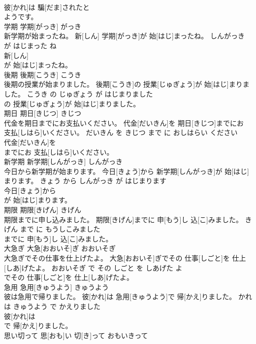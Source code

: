 \documentclass[8pt]{extreport}
\begin{document}
\begin{CJK}{UTF8}{min}
\\	彼[かれ]は 騙[だま]されたと
\\	ようです。			
\\	学期	学期[がっき]	がっき	
\\	新学期が始まったね。	新[しん] 学期[がっき]が 始[はじ]まったね。	しんがっき が はじまった ね	
\\	新[しん]
\\	が 始[はじ]まったね。			
\\	後期	後期[こうき]	こうき	
\\	後期の授業が始まりました。	後期[こうき]の 授業[じゅぎょう]が 始[はじ]まりました。	こうき の じゅぎょう が はじまりました	
\\	の 授業[じゅぎょう]が 始[はじ]まりました。			
\\	期日	期日[きじつ]	きじつ	
\\	代金を期日までにお支払いください。	代金[だいきん]を 期日[きじつ]までにお 支払[しはら]いください。	だいきん を きじつ まで に おしはらい ください	
\\	代金[だいきん]を
\\	までにお 支払[しはら]いください。			
\\	新学期	新学期[しんがっき]	しんがっき	
\\	今日から新学期が始まります。	今日[きょう]から 新学期[しんがっき]が 始[はじ]まります。	きょう から しんがっき が はじまります	
\\	今日[きょう]から
\\	が 始[はじ]まります。			
\\	期限	期限[きげん]	きげん	
\\	期限までに申し込みました。	期限[きげん]までに 申[もう]し 込[こ]みました。	きげん まで に もうしこみました	
\\	までに 申[もう]し 込[こ]みました。			
\\	大急ぎ	大急[おおいそ]ぎ	おおいそぎ	
\\	大急ぎでその仕事を仕上げたよ。	大急[おおいそ]ぎでその 仕事[しごと]を 仕上[しあ]げたよ。	おおいそぎ で その しごと を しあげた よ	
\\	でその 仕事[しごと]を 仕上[しあ]げたよ。			
\\	急用	急用[きゅうよう]	きゅうよう	
\\	彼は急用で帰りました。	彼[かれ]は 急用[きゅうよう]で 帰[かえ]りました。	かれ は きゅうよう で かえりました	
\\	彼[かれ]は
\\	で 帰[かえ]りました。			
\\	思い切って	思[おも]い 切[き]って	おもいきって	

\end{CJK}
\end{document}
